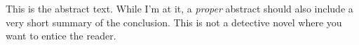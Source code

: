 This is the abstract text. While I'm at it, a \textit{proper} abstract should
also include a very short summary of the conclusion. This is not a
detective novel where you want to entice the reader.
